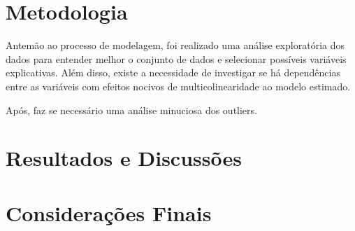\documentclass[
	12pt,				%
	openright,			%
	oneside,      %
	a4paper,			%
	english,			%
	french,				%
	spanish,			%
	brazil,				%
	]{abntex2}\usepackage[]{graphicx}\usepackage[table]{xcolor}
\theoremstyle{definition}
\begin{document}
\chapter{Metodologia}




Antemão ao processo de modelagem, foi realizado uma análise exploratória dos dados para entender melhor o conjunto de dados e selecionar possíveis variáveis explicativas. Além disso, existe a necessidade de investigar se há dependências entre as variáveis com efeitos nocivos de multicolinearidade ao modelo estimado.



Após, faz se necessário uma análise minuciosa dos outliers.

\chapter{Resultados e Discussões}





\chapter{Considerações Finais}






%
%


\end{document}
